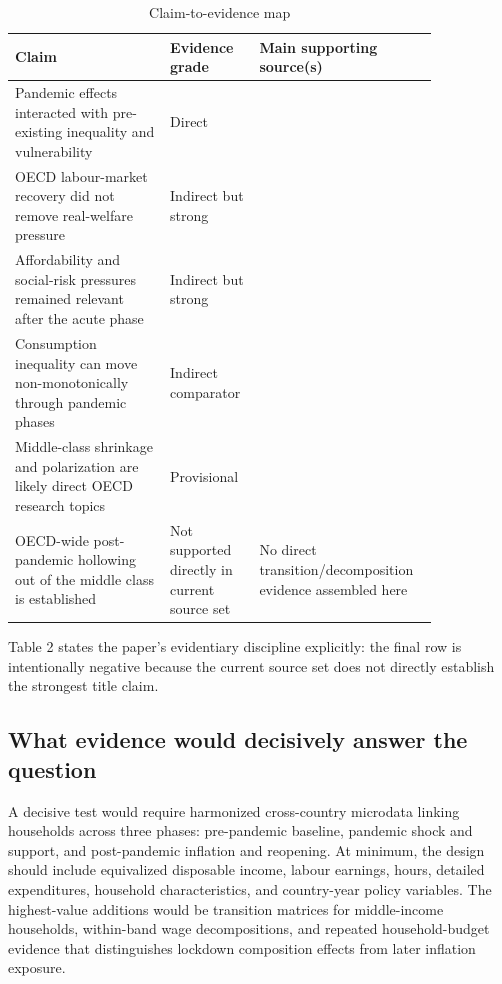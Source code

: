 \documentclass[11pt]{article}
\begin{document}
\begin{table}[t]
\centering
\caption{Claim-to-evidence map}
\begin{tabular}{p{0.34\linewidth}p{0.16\linewidth}p{0.34\linewidth}}
\toprule
Claim & Evidence grade & Main supporting source(s) \\
\midrule
Pandemic effects interacted with pre-existing inequality and vulnerability & Direct & \citet{covid19andincomein2021springer} \\
OECD labour-market recovery did not remove real-welfare pressure & Indirect but strong & \citet{oecdemploymentoutl2024oecd} \\
Affordability and social-risk pressures remained relevant after the acute phase & Indirect but strong & \citet{societyataglance202024bolletti} \\
Consumption inequality can move non-monotonically through pandemic phases & Indirect comparator & \citet{consumptioninequal2024bls} \\
Middle-class shrinkage and polarization are likely direct OECD research topics & Provisional & \citet{oecdeconomicsdepar2023one} \\
OECD-wide post-pandemic hollowing out of the middle class is established & Not supported directly in current source set & No direct transition/decomposition evidence assembled here \\
\bottomrule
\end{tabular}
\end{table}

\noindent Table 2 states the paper's evidentiary discipline explicitly: the final row is intentionally negative because the current source set does not directly establish the strongest title claim.

\subsection{What evidence would decisively answer the question}
A decisive test would require harmonized cross-country microdata linking households across three phases: pre-pandemic baseline, pandemic shock and support, and post-pandemic inflation and reopening. At minimum, the design should include equivalized disposable income, labour earnings, hours, detailed expenditures, household characteristics, and country-year policy variables. The highest-value additions would be transition matrices for middle-income households, within-band wage decompositions, and repeated household-budget evidence that distinguishes lockdown composition effects from later inflation exposure.
\end{document}
